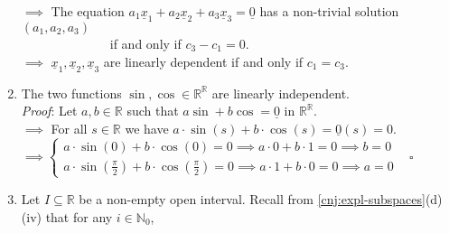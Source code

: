 \documentclass[
  12pt,
  a4paper,
  twoside]{article}
\theoremstyle{plain}
\theoremstyle{definition}
\begin{document}
\begin{enumerate}
  \hspace*{0.333em}\hspace*{0.333em}\hspace*{0.333em}\hspace*{0.333em}\(\implies\) The equation \(a_1\underline{x}_1 + a_2\underline{x}_2 + a_3\underline{x}_3 = \underline{0}\) has a non-trivial solution \((a_1, a_2, a_3)\)\\
  \hspace*{0.333em}\hspace*{0.333em}\hspace*{0.333em}\hspace*{0.333em} ~~~~ ~~~~ ~~~~ if and only if \(c_3 - c_1 = 0\).\\
  \hspace*{0.333em}\hspace*{0.333em}\hspace*{0.333em}\hspace*{0.333em}\(\implies\) \(\underline{x}_1, \underline{x}_2, \underline{x}_3\) are linearly dependent if and only if \(c_1 = c_3\).
\item
  The two functions \(\sin , \cos \in \mathbb{R}^{\mathbb{R}}\) are linearly independent.\\
  \emph{Proof}: Let \(a,b \in \mathbb{R}\) such that \(a \sin + b \cos = \underline{0}\) in \(\mathbb{R}^{\mathbb{R}}\).\\
  \hspace*{0.333em}\hspace*{0.333em}\hspace*{0.333em}\hspace*{0.333em} \(\implies\) For all \(s\in \mathbb{R}\) we have \(a\cdot\sin(s) + b\cdot \cos(s) = \underline{0}(s) = 0\).\\
  \hspace*{0.333em}\hspace*{0.333em}\hspace*{0.333em}\hspace*{0.333em} \(\implies \begin{cases} a\cdot \sin (0) + b\cdot \cos (0) = 0 \implies a \cdot 0 + b \cdot 1 = 0 \implies b=0 \\ a\cdot \sin (\frac{\pi}2) + b\cdot \cos (\frac{\pi}2) = 0 \implies a \cdot 1 + b \cdot 0 = 0 \implies a=0 \end{cases}\) \hfill~{\(\square\)}
\item
  Let \(I \subseteq \mathbb{R}\) be a non-empty open interval.
  Recall from \ref{cnj:expl-subspaces}(d)(iv) that for any \(i \in \mathbb{N}_{0}\),

\end{enumerate}
\end{document}
